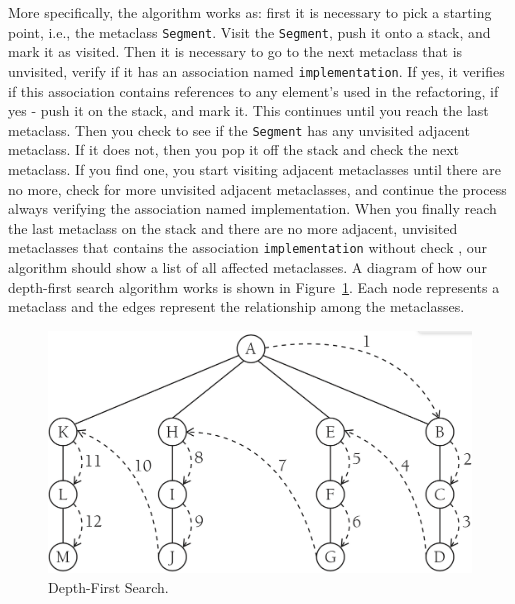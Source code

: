 More specifically, the algorithm works as: first it is necessary to pick a starting point, i.e., the metaclass \texttt{Segment}. Visit the \texttt{Segment}, push it onto a stack, and mark it as visited. Then it is necessary to go to the next metaclass that is unvisited, verify if it has an association named \texttt{implementation}. If yes, it verifies if this association contains references to any element's used in the refactoring, if yes - push it on the stack, and mark it. This continues until you reach the last metaclass. Then you check to see if the \texttt{Segment} has any unvisited adjacent metaclass. If it does not, then you pop it off the stack and check the next metaclass. If you find one, you start visiting adjacent metaclasses until there are no more, check for more unvisited adjacent metaclasses, and continue the process always verifying the association named implementation. When you finally reach the last metaclass on the stack and there are no more adjacent, unvisited metaclasses that contains the association \texttt{implementation} without check , our algorithm should show a list of all affected metaclasses. 
%
%
%
%
%
%
%
%
%
A diagram of how our depth-first search algorithm works is shown in Figure~\ref{fig:algWorks2}. Each node represents a metaclass and the edges represent the relationship among the metaclasses.
\begin{figure}
	\centering
	\includegraphics[scale=0.2]{figuras/algWorks2}
	\caption{Depth-First Search.}
	\label{fig:algWorks2}
\end{figure}











